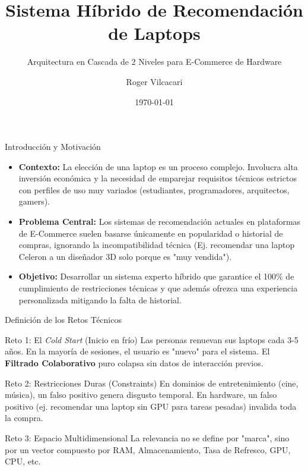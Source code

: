 \documentclass[aspectratio=169]{beamer}
\title[Recomendador Híbrido]{\textbf{Sistema Híbrido de Recomendación de Laptops}}
\subtitle{Arquitectura en Cascada de 2 Niveles para E-Commerce de Hardware}
\author[Roger Vilcacari]{Roger Vilcacari}
\institute[UNAP]{Sistemas de Recomendación - Proyecto Final}
\date{\today}
\begin{document}
\begin{frame}
    \titlepage
\end{frame}

\begin{frame}{Introducción y Motivación}
    \begin{itemize}
        \item \textbf{Contexto:} La elección de una laptop es un proceso complejo. Involucra alta inversión económica y la necesidad de emparejar requisitos técnicos estrictos con perfiles de uso muy variados (estudiantes, programadores, arquitectos, gamers).
        \vspace{0.3cm}
        \item \textbf{Problema Central:} Los sistemas de recomendación actuales en plataformas de E-Commerce suelen basarse únicamente en popularidad o historial de compras, ignorando la incompatibilidad técnica (Ej. recomendar una laptop Celeron a un diseñador 3D solo porque es "muy vendida").
        \vspace{0.3cm}
        \item \textbf{Objetivo:} Desarrollar un sistema experto híbrido que garantice el 100\% de cumplimiento de restricciones técnicas y que además ofrezca una experiencia personalizada mitigando la falta de historial.
    \end{itemize}
\end{frame}

\begin{frame}{Definición de los Retos Técnicos}
    \begin{block}{Reto 1: El \textit{Cold Start} (Inicio en frío)}
        Las personas renuevan sus laptops cada 3-5 años. En la mayoría de sesiones, el usuario es "nuevo" para el sistema. El \textbf{Filtrado Colaborativo} puro colapsa sin datos de interacción previos.
    \end{block}
    
    \vspace{0.2cm}
    \begin{block}{Reto 2: Restricciones Duras (Constraints)}
        En dominios de entretenimiento (cine, música), un falso positivo genera disgusto temporal. En hardware, un falso positivo (ej. recomendar una laptop sin GPU para tareas pesadas) invalida toda la compra.
    \end{block}

    \vspace{0.2cm}
    \begin{block}{Reto 3: Espacio Multidimensional}
        La relevancia no se define por "marca", sino por un vector compuesto por RAM, Almacenamiento, Tasa de Refresco, GPU, CPU, etc.
    \end{block}
\end{frame}
\end{document}
